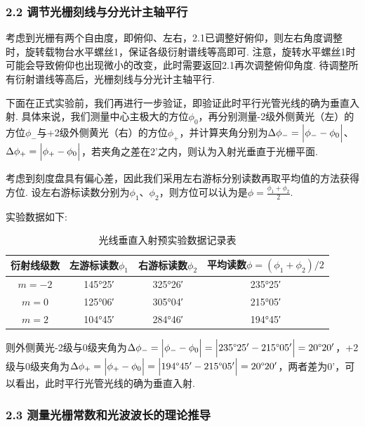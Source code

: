 \documentclass[UTF8]{ctexart}
\begin{document}
\subsubsection*{2.2 调节光栅刻线与分光计主轴平行}
考虑到光栅有两个自由度，即俯仰、左右，2.1已调整好俯仰，则左右角度调整时，旋转载物台水平螺丝1，保证各级衍射谱线等高即可. 注意，旋转水平螺丝1时可能会导致俯仰也出现微小的改变，此时需要返回2.1再次调整俯仰角度. 待调整所有衍射谱线等高后，光栅刻线与分光计主轴平行.\par
下面在正式实验前，我们再进行一步验证，即验证此时平行光管光线的确为垂直入射. 具体来说，我们测量中心主极大的方位$\phi_0$，再分别测量-2级外侧黄光（左）的方位$\phi_-$与+2级外侧黄光（右）的方位$\phi_+$，并计算夹角分别为$\Delta\phi_-=\Big{|}\phi_--\phi_0\Big{|}$、$\Delta\phi_+=\Big{|}\phi_+-\phi_0\Big{|}$，若夹角之差在2'之内，则认为入射光垂直于光栅平面.\par
考虑到刻度盘具有偏心差，因此我们采用左右游标分别读数再取平均值的方法获得方位. 设左右游标读数分别为$\phi_1$、$\phi_2$，则方位可以认为是$\displaystyle{\phi=\frac{\phi_1+\phi_2}{2}}$.\\ \par
实验数据如下:
\begin{table}[H]\begin{center}
    \caption{光线垂直入射预实验数据记录表}
    \begin{tabular}{|c|c|c|c|}
        \hline
        衍射线级数&左游标读数$\phi_1$&右游标读数$\phi_2$&平均读数$\phi=(\phi_1+\phi_2)/2$\\
        \hline
        $m=-2$&	145°25′ &325°26′&	235°25′\\
        \hline
        $m=0$	&	125°06′ &305°04′	&215°05′\\
        \hline
        $m=2$	&	104°45′& 284°46′&	194°45′\\
        \hline        
    \end{tabular}
\end{center}\end{table}
则外侧黄光-2级与0级夹角为$\Delta\phi_-=\Big{|}\phi_--\phi_0\Big{|}=\Big{|}235\degree25'-215\degree05'\Big{|}=20\degree20'$，+2级与0级夹角为$\Delta\phi_+=\Big{|}\phi_+-\phi_0\Big{|}=\Big{|}194\degree45'-215\degree05'\Big{|}=20\degree20'$，两者差为0'，可以看出，此时平行光管光线的确为垂直入射.

\subsubsection*{2.3 测量光栅常数和光波波长的理论推导}
\end{document}
